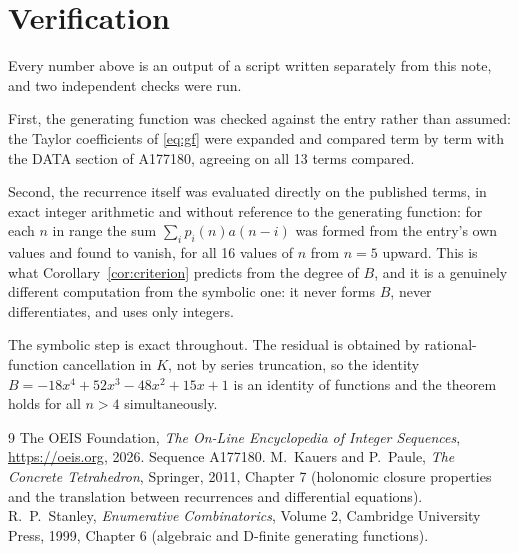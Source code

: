 \documentclass[11pt,a4paper]{article}
\theoremstyle{plain}
\theoremstyle{definition}
\begin{document}
\section{Verification}

Every number above is an output of a script written separately from this note, and two
independent checks were run.

First, the generating function was checked against the entry rather than assumed: the
Taylor coefficients of \eqref{eq:gf} were expanded and compared term by term with the DATA
section of A177180, agreeing on all 13 terms compared.

Second, the recurrence itself was evaluated directly on the published terms, in exact
integer arithmetic and without reference to the generating function: for each $n$ in range
the sum $\sum_{i}p_{i}(n)a(n-i)$ was formed from the entry's own values and found to
vanish, for all 16 values of $n$ from $n=5$ upward. This is what
Corollary~\ref{cor:criterion} predicts from the degree of $B$, and it is a genuinely
different computation from the symbolic one: it never forms $B$, never differentiates, and
uses only integers.

The symbolic step is exact throughout. The residual is obtained by rational-function
cancellation in $K$, not by series truncation, so the identity $B=- 18 x^{4} + 52 x^{3} - 48 x^{2} + 15 x + 1$ is an
identity of functions and the theorem holds for all $n>4$ simultaneously.

\begin{thebibliography}{9}
 The OEIS Foundation, \emph{The On-Line Encyclopedia of Integer Sequences},
\url{https://oeis.org}, 2026. Sequence A177180.
 M.~Kauers and P.~Paule, \emph{The Concrete Tetrahedron}, Springer, 2011,
Chapter 7 (holonomic closure properties and the translation between recurrences and
differential equations).
 R.~P.~Stanley, \emph{Enumerative Combinatorics}, Volume 2, Cambridge
University Press, 1999, Chapter 6 (algebraic and D-finite generating functions).
\end{thebibliography}
\end{document}
